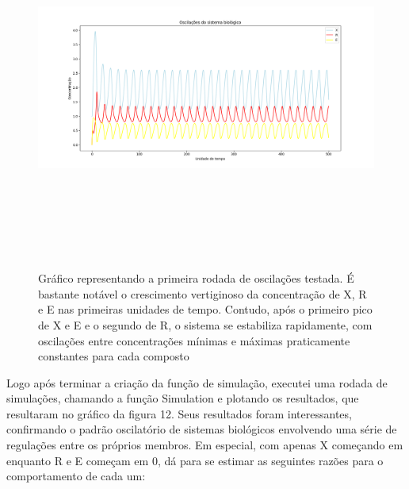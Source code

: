 \documentclass[brazilian,12pt,a4paper,final]{article}
\begin{document}
	\begin{figure}[hbtp]
		\begin{center}
			\includegraphics[height=12cm, width=18cm]{oscPadrao.png}
			\caption{Gráfico representando a primeira rodada de oscilações testada. É bastante notável o crescimento vertiginoso da concentração de X, R e E nas primeiras unidades de tempo. Contudo, após o primeiro pico de X e E e o segundo de R, o sistema se estabiliza rapidamente, com oscilações entre concentrações mínimas e máximas praticamente constantes para cada composto}
			\label{fig}
		\end{center}
	\end{figure}
	
	Logo após terminar a criação da função de simulação, executei uma rodada de simulações, chamando a função Simulation e plotando os resultados, que resultaram no gráfico da figura 12. Seus resultados foram interessantes, confirmando o padrão oscilatório de sistemas biológicos envolvendo uma série de regulações entre os próprios membros. Em especial, com apenas X começando em  enquanto R e E começam em 0, dá para se estimar as seguintes razões para o comportamento de cada um:
	
\end{document}
